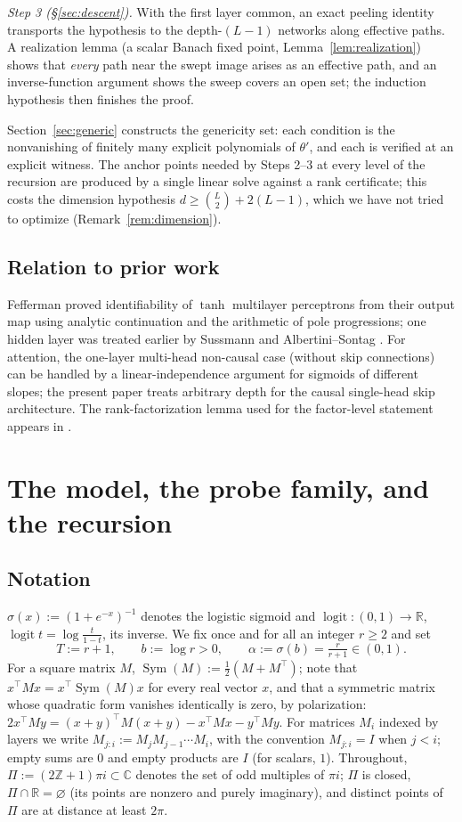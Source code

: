 \documentclass[11pt]{article}
\theoremstyle{definition}
\theoremstyle{remark}
\theoremstyle{plain}
\newcommand{\R}{\mathbb{R}}
\newcommand{\C}{\mathbb{C}}
\newcommand{\Z}{\mathbb{Z}}
\newcommand{\Sym}{\operatorname{Sym}}
\newcommand{\logit}{\operatorname{logit}}
\newcommand{\sig}{\sigma}
\begin{document}
\smallskip
\emph{Step 3 (\S\ref{sec:descent}).}  With the first layer common, an exact peeling
identity transports the hypothesis to the depth-$(L-1)$ networks along effective paths.  A
realization lemma (a scalar Banach fixed point, Lemma~\ref{lem:realization}) shows that
\emph{every} path near the swept image arises as an effective path, and an inverse-function
argument shows the sweep covers an open set; the induction hypothesis then finishes the
proof.

\smallskip
Section~\ref{sec:generic} constructs the genericity set: each condition is the
nonvanishing of finitely many explicit polynomials of $\theta'$, and each is verified at an
explicit witness.  The anchor points needed by Steps 2--3 at every level of the recursion
are produced by a single linear solve against a rank certificate; this costs the dimension
hypothesis $d\ge\binom{L}{2}+2(L-1)$, which we have not tried to optimize
(Remark~\ref{rem:dimension}).

\subsection*{Relation to prior work}
Fefferman \cite{fefferman1994reconstructing} proved identifiability of $\tanh$
multilayer perceptrons from their output map using analytic continuation and the
arithmetic of pole progressions; one hidden layer was treated earlier by Sussmann
\cite{sussmann1992} and Albertini--Sontag \cite{albertinisontag}.  For attention, the
one-layer multi-head non-causal case (without skip connections) can be handled by a
linear-independence argument for sigmoids of different slopes; the present paper treats
arbitrary depth for the causal single-head skip architecture.  The rank-factorization
lemma used for the factor-level statement appears in \cite{henry2025geometry}.

\section{The model, the probe family, and the recursion}\label{sec:model}

\subsection{Notation}\label{subsec:notation}
$\sig(x):=(1+e^{-x})^{-1}$ denotes the logistic sigmoid and
$\logit:(0,1)\to\R$, $\logit t=\log\frac{t}{1-t}$, its inverse.  We fix once and for all an
integer $r\ge2$ and set
\[
T:=r+1,\qquad b:=\log r>0,\qquad \alpha:=\sig(b)=\tfrac{r}{r+1}\in(0,1).
\]
For a square matrix $M$, $\Sym(M):=\tfrac12(M+M^\top)$; note that
$x^\top Mx=x^\top\Sym(M)x$ for every real vector $x$, and that a symmetric matrix whose
quadratic form vanishes identically is zero, by polarization:
$2x^\top My=(x+y)^\top M(x+y)-x^\top Mx-y^\top My$.  For matrices $M_i$ indexed by layers
we write $M_{j:i}:=M_jM_{j-1}\cdots M_i$, with the convention $M_{j:i}=I$ when $j<i$; empty
sums are $0$ and empty products are $I$ (for scalars, $1$).  Throughout,
$\Pi:=(2\Z+1)\pi i\subset\C$ denotes the set of odd multiples of $\pi i$; $\Pi$ is closed,
$\Pi\cap\R=\varnothing$ (its points are nonzero and purely imaginary), and distinct points
of $\Pi$ are at distance at least $2\pi$.
\end{document}
